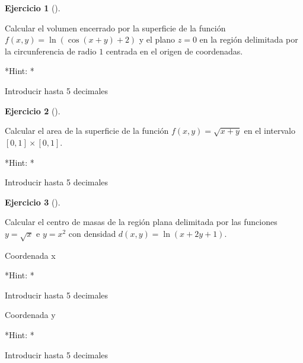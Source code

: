 \documentclass[
  a4paper,
]{scrreport}
\theoremstyle{definition}
\newtheorem{exercise}{Ejercicio}[chapter]
\theoremstyle{remark}
\begin{document}
\begin{exercise}[]\protect\hypertarget{exr-integrales-funciones-varias-variables-propuesto-3}{}\label{exr-integrales-funciones-varias-variables-propuesto-3}

Calcular el volumen encerrado por la superficie de la función
\(f(x,y)=\ln(\cos(x+y)+2)\) y el plano \(z=0\) en la región delimitada
por la circunferencia de radio \(1\) centrada en el origen de
coordenadas.

\vspace{18pt}*Hint: *

Introducir hasta 5 decimales

\end{exercise}

\begin{exercise}[]\protect\hypertarget{exr-integrales-funciones-varias-variables-propuesto-4}{}\label{exr-integrales-funciones-varias-variables-propuesto-4}

Calcular el area de la superficie de la función \(f(x,y)=\sqrt{x+y}\) en
el intervalo \([0,1]\times[0,1]\).

\vspace{18pt}*Hint: *

Introducir hasta 5 decimales

\end{exercise}

\begin{exercise}[]\protect\hypertarget{exr-integrales-funciones-varias-variables-propuesto-5}{}\label{exr-integrales-funciones-varias-variables-propuesto-5}

Calcular el centro de masas de la región plana delimitada por las
funciones \(y=\sqrt{x}\) e \(y=x^2\) con densidad
\(d(x,y)= \ln(x+2y+1)\).

Coordenada x

\vspace{18pt}*Hint: *

Introducir hasta 5 decimales

Coordenada y

\vspace{18pt}*Hint: *

Introducir hasta 5 decimales

\end{exercise}
\end{document}
